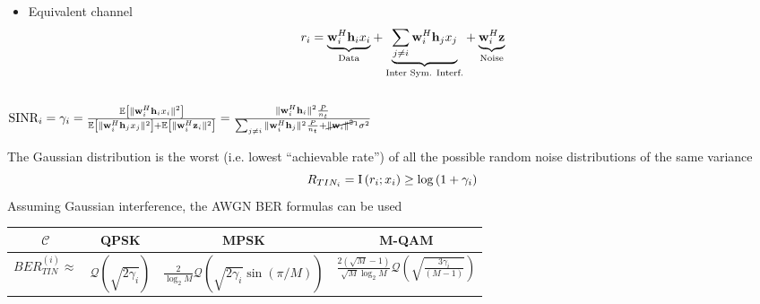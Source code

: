 \documentclass[xcolor=dvipsnames,aspectratio=169]{beamer}
\begin{document}
{\begin{columns}
\begin{column}{6cm}
\begin{itemize}
    \item Equivalent channel
    $$r_i=\underset{\textnormal{Data}}{\underbrace{\mathbf{w}_i^H\mathbf{h}_i x_i}} +\underset{\textnormal{Inter Sym. Interf.}}{\underbrace{\sum_{j\neq i}\mathbf{w}_i^H\mathbf{h}_j x_j}} +\underset{\textnormal{Noise}}{\underbrace{\mathbf{w}_i^H\mathbf{z}}}$$
     \end{itemize}
 \end{column}
\end{columns} 
\begin{definition}
 $ \textnormal{SINR}_i=\gamma_i=\frac{{\mathbb{E}_{}\left[ \|\mathbf{w}_i^H\mathbf{h}_i x_i\|^2\right]}}{{\mathbb{E}_{}\left[ \|\mathbf{w}_i^H\mathbf{h}_j x_j\|^2\right]}+{\mathbb{E}_{}\left[ \|\mathbf{w}_i^H\mathbf{z}_i\|^2\right]}}=\frac{\|\mathbf{w}_i^H\mathbf{h}_i\|^2\frac{P}{n_t}}{\sum_{j\neq i}\|\mathbf{w}_i^H\mathbf{h}_j\|^2\frac{P}{n_t}+\cancel{\|\mathbf{w}_i\|^2}^{1}\sigma^2}$
\end{definition}
\begin{theorem}
 The Gaussian distribution is the worst (i.e. lowest ``achievable rate'') of all the possible random noise distributions of the same variance
 $$R_{TIN_i}={\textnormal{I}\left(r_i;x_i\right)}\geq \log\left(1+\gamma_i\right)$$
 Assuming Gaussian interference, the AWGN BER formulas can be used
 \begin{table}
 \begin{tabular}{c|ccc}
  $\mathcal{C}$& QPSK & MPSK & M-QAM\\\hline
  $BER_{TIN}^{(i)}\approx$ & $\mathcal{Q}(\sqrt{2\gamma_i})$ & $\frac{2}{\log_2 M}\mathcal{Q}(\sqrt{2\gamma_i}\sin(\pi/M))$& $\frac{2(\sqrt{M}-1)}{\sqrt{M}\log_2 M}\mathcal{Q}(\sqrt{\frac{3\gamma_i}{(M-1)}})$ \\
 \end{tabular}
 \end{table}
\end{theorem}

}
\end{document}
